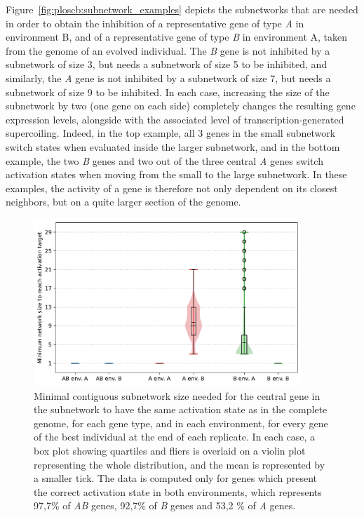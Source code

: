 Figure~\ref{fig:ploscb:subnetwork_examples} depicts the subnetworks that are needed in order to obtain the inhibition of a representative gene of type \emph{A} in environment B, and of a representative gene of type \emph{B} in environment A, taken from the genome of an evolved individual.
The \emph{B} gene is not inhibited by a subnetwork of size 3, but needs a subnetwork of size 5 to be inhibited, and similarly, the \emph{A} gene is not inhibited by a subnetwork of size 7, but needs a subnetwork of size 9 to be inhibited.
In each case, increasing the size of the subnetwork by two (one gene on each side) completely changes the resulting gene expression levels, alongside with the associated level of transcription-generated supercoiling.
Indeed, in the top example, all 3 genes in the small subnetwork switch states when evaluated inside the larger subnetwork, and in the bottom example, the two \emph{B} genes and two out of the three central \emph{A} genes switch activation states when moving from the small to the large subnetwork.
In these examples, the activity of a gene is therefore not only dependent on its closest neighbors, but on a quite larger section of the genome.

\begin{figure}[H]
\centering
\includegraphics[width=0.9\textwidth]{ploscb/img/min_network_size.pdf}
\caption[Minimal subnetwork size needed to obtain the correct activation state per gene type]{Minimal contiguous subnetwork size needed for the central gene in the subnetwork to have the same activation state as in the complete genome, for each gene type, and in each environment, for every gene of the best individual at the end of each replicate.
In each case, a box plot showing quartiles and fliers is overlaid on a violin plot representing the whole distribution, and the mean is represented by a smaller tick.
The data is computed only for genes which present the correct activation state in both environments, which represents 97,7\% of \emph{AB} genes, 92,7\% of \emph{B} genes and 53,2 \% of \emph{A} genes.}
\label{fig:ploscb:min_subnetwork}
\end{figure}

